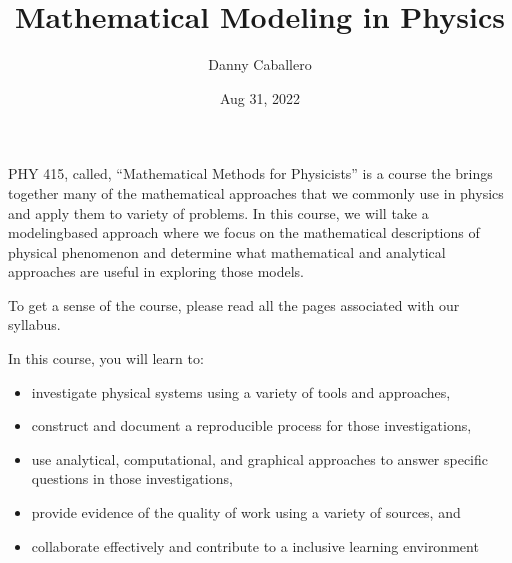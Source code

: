 \documentclass[letterpaper,10pt,english]{jupyterBook}
\title{Mathematical Modeling in Physics}
\date{Aug 31, 2022}
\author{Danny Caballero}
\begin{document}
\pagestyle{empty}
\sphinxmaketitle
\pagestyle{plain}
\sphinxtableofcontents
\pagestyle{normal}
\label{\detokenize{content/intro::doc}}


\sphinxAtStartPar
PHY 415, called, “Mathematical Methods for Physicists” is a course the brings together many of the mathematical approaches that we commonly use in physics and apply them to variety of problems. In this course, we will take a modeling\sphinxhyphen{}based approach where we focus on the mathematical descriptions of physical phenomenon and determine what mathematical and analytical approaches are useful in exploring those models.

\sphinxAtStartPar
To get a sense of the course, please read all the pages associated with our syllabus.

\begin{DUlineblock}{0em}
\item[] 
\end{DUlineblock}

\sphinxAtStartPar
In this course, you will learn to:
\begin{itemize}
\item {} 
\sphinxAtStartPar
investigate physical systems using a variety of tools and approaches,

\item {} 
\sphinxAtStartPar
construct and document a reproducible process for those investigations,

\item {} 
\sphinxAtStartPar
use analytical, computational, and graphical approaches to answer specific questions in those investigations,

\item {} 
\sphinxAtStartPar
provide evidence of the quality of work using a variety of sources, and

\item {} 
\sphinxAtStartPar
collaborate effectively and contribute to a inclusive learning environment

\end{itemize}

\begin{DUlineblock}{0em}
\item[] 
\end{DUlineblock}
\end{document}
